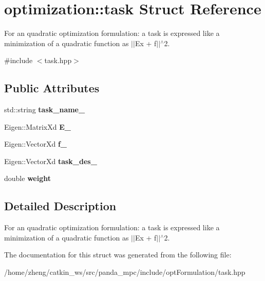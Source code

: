 \hypertarget{structoptimization_1_1task}{}\section{optimization\+:\+:task Struct Reference}
\label{structoptimization_1_1task}


For an quadratic optimization formulation\+: a task is expressed like a minimization of a quadratic function as $\vert$$\vert$\+Ex + f$\vert$$\vert$$^\wedge$2.  




{\ttfamily \#include $<$task.\+hpp$>$}

\subsection*{Public Attributes}
\begin{DoxyCompactItemize}
\item 
\mbox{\label{structoptimization_1_1task_a4d4ed505487ea6ffca5a1a8f0fb4a066}} 
std\+::string {\bfseries task\+\_\+name\+\_\+}
\item 
\mbox{\label{structoptimization_1_1task_aa1ab963ded85ee321544cc83a825fb87}} 
Eigen\+::\+Matrix\+Xd {\bfseries E\+\_\+}
\item 
\mbox{\label{structoptimization_1_1task_a73febda64e56db467f3b309e7385f65a}} 
Eigen\+::\+Vector\+Xd {\bfseries f\+\_\+}
\item 
\mbox{\label{structoptimization_1_1task_a4611e162eef2d4690e535888354b1ace}} 
Eigen\+::\+Vector\+Xd {\bfseries task\+\_\+des\+\_\+}
\item 
\mbox{\label{structoptimization_1_1task_ab047f723415fc9b5228b605c200899d9}} 
double {\bfseries weight}
\end{DoxyCompactItemize}


\subsection{Detailed Description}
For an quadratic optimization formulation\+: a task is expressed like a minimization of a quadratic function as $\vert$$\vert$\+Ex + f$\vert$$\vert$$^\wedge$2. 

The documentation for this struct was generated from the following file\+:\begin{DoxyCompactItemize}
\item 
/home/zheng/catkin\+\_\+ws/src/panda\+\_\+mpc/include/opt\+Formulation/task.\+hpp\end{DoxyCompactItemize}
